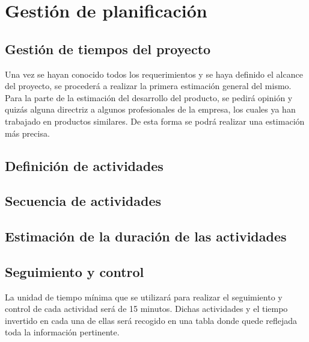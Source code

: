 \section{Gestión de planificación}
\subsection{Gestión de tiempos del proyecto}
Una vez se hayan conocido todos los requerimientos y se haya definido el
alcance del proyecto, se procederá a realizar la primera estimación general
del mismo. Para la parte de la estimación del desarrollo del producto, se
pedirá opinión y quizás alguna directriz a algunos profesionales de la empresa,
los cuales ya han trabajado en productos similares. De esta forma se podrá
realizar una estimación más precisa.

\subsection{Definición de actividades}

\subsection{Secuencia de actividades}

\subsection{Estimación de la duración de las actividades}

\subsection{Seguimiento y control}
La unidad de tiempo mínima que se utilizará para realizar el seguimiento y
control de cada actividad será de 15 minutos. Dichas actividades y el tiempo
invertido en cada una de ellas será recogido en una tabla donde quede reflejada
toda la información pertinente.
